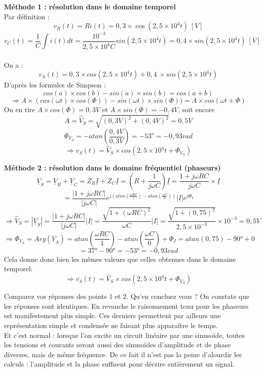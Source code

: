 {
\textbf{Méthode 1 : résolution dans le domaine temporel}\\
Par définition :\\
$$v_R(t)=Ri(t)=0,3\times \cos(2,5\times 10^4 t)\ [V]$$
$$v_C(t)=\frac{1}{C} \int{i(t)dt}=\frac{10^{-3}}{2,5\times 10^4 C}sin(2,5 \times 10^4 t)=0,4\times sin(2,5 \times 10^4 t)\ [V]$$\\
On a : $$v_S (t)=0,3\times cos(2,5 \times 10^4 t)+0,4\ \times  sin(2,5 \times 10^4 t)$$
D’après les formules de Simpson : 
$$cos(a)\times cos(b)-sin(a)\times sin(b)=cos(a+b)$$
$$\Rightarrow A\times (cos(\omega t)\times cos(\Phi))-sin(\omega t)\times sin(\Phi))=A\times cos(\omega t+\Phi)$$
On en tire $A\times cos(\Phi)=0,3V$ et $A\times sin(\Phi)=-0,4V$, soit encore $$A=\widehat{V}_S=\sqrt{(0,3V)^2+(0,4V)^2}=0,5V$$
$$\Phi_{V_S}=-atan(\frac{0,4V}{0,3V})=-53^o=-0,93rad$$
$$\Rightarrow v_S(t)=\widehat{V}_S\times cos(2,5 \times 10^4 t+\Phi_{V_S})$$

\textbf{Méthode 2 : résolution dans le domaine fréquentiel (phaseurs)}\\
$$\underline{V}_S=\underline{V}_R+\underline{V}_C=Z_R\underline{I}+Z_C\underline{I}=(R+\frac{1}{j\omega C})\underline{I}=\frac{1+j\omega RC}{j\omega C}\times \underline{I}$$
$$=\frac{|1+j\omega RC|}{|j\omega C|}e^{j(atan(\frac{\omega RC}{1})-atan(\frac{\omega C}{0}))} |\underline{I}|e^{j\Phi_I}$$
$$\Rightarrow \widehat{V}_S=|\underline{V}_S|=\frac{|1+j\omega RC|}{|j\omega C|}|I|=\frac{\sqrt{1+(\omega RC)^2}}{\omega C}|I|=\frac{\sqrt{1+(0,75)^2}}{2,5\times 10^{-3}}\times 10^{-3}=0,5V$$
$$\Rightarrow \Phi_{V_S}=Arg(\underline{V}_S)=atan(\frac{\omega RC}{1})-atan(\frac{\omega C}{0})+\Phi_I=atan(0,75)-90°+0$$
$$=37°-90°=-53°=-0,93rad$$
Cela donne donc bien les mêmes valeurs que celles obtenues dans le domaine temporel:
$$\Rightarrow v_S(t)=\widehat{V}_S\times cos(2,5 \times 10^4 t+\Phi_{V_S})$$
}
{
Comparez vos réponses des points 1 et 2. Qu’en concluez vous ?
}
{On constate que les réponses sont identiques. En revanche le raisonnement tenu pour les phaseurs est manifestement plus simple. Ces derniers permettent par ailleurs une représentation simple et condensée ne faisant plus apparaître le temps.\\
Et c’est normal : lorsque l’on excite un circuit linéaire par une sinusoïde, toutes les tensions et courants seront aussi des sinusoïdes d’amplitude et de phase diverses, mais de même fréquence. De ce fait il n’est pas la peine d’alourdir les calculs : l’amplitude et la phase suffisent pour décrire entièrement un signal.}

